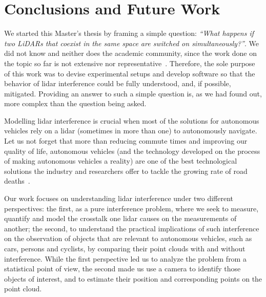 \chapter{Conclusions and Future Work}
\label{chapter:conclusion}

We started this Master's thesis by framing a simple question: \textit{``What happens if two LiDARs that coexist in the same space are switched on simultaneously?''}. We did not know and neither does the academic community, since the work done on the topic so far is not extensive nor representative~\cite{Kim2015a, Kim2015b, Kim2015c, Kim2017, Popko2019a, Popko2019b}. Therefore, the sole purpose of this work was to devise experimental setups and develop software so that the behavior of \ac{lidar} interference could be fully understood, and, if possible, mitigated. Providing an answer to such a simple question is, as we had found out, more complex than the question being asked.

Modelling \ac{lidar} interference is crucial when most of the solutions for autonomous vehicles rely on a \ac{lidar} (sometimes in more than one) to autonomously navigate. Let us not forget that more than reducing commute times and improving our quality of life, autonomous vehicles (and the technology developed on the process of making autonomous vehicles a reality) are one of the best technological solutions the industry and researchers offer to tackle the growing rate of road deaths~\cite{WHO2018}. %

Our work focuses on understanding \ac{lidar} interference under two different perspectives: the first, as a pure interference problem, where we seek to measure, quantify and model the crosstalk one \ac{lidar} causes on the measurements of another; the second, to understand the practical implications of such interference on the observation of objects that are relevant to autonomous vehicles, such as cars, persons and cyclists, by comparing their point clouds with and without interference. While the first perspective led us to analyze the problem from a statistical point of view, the second made us use a camera to identify those objects of interest, 
and to estimate their position and corresponding points on the point cloud. 


